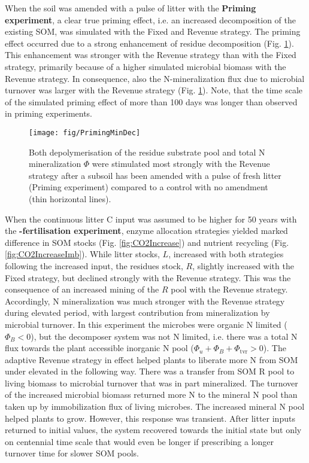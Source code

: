 When the soil was amended with a pulse of litter with the \textbf{Priming
experiment}, a clear true priming effect, i.e. an increased decomposition of the
existing SOM, was simulated with the Fixed and Revenue strategy.
The priming effect occurred due to a strong enhancement of residue decomposition
(Fig. \ref{fig:PrimingMinDec}). This
enhancement was stronger with the Revenue strategy than with the Fixed strategy,
primarily because of a higher simulated microbial biomass with the Revenue
strategy. In consequence, also the N-mineralization flux due to microbial
turnover was larger with the Revenue strategy (Fig. \ref{fig:PrimingMinDec}).
Note, that the time scale of the simulated priming effect of more than 100 days
was longer than observed in priming experiments.

\begin{figure}[t] \vspace*{2mm}
\begin{center}
\texttt{[image: fig/PrimingMinDec]}
\end{center}
\caption{
Both depolymerisation of the residue substrate pool and total N
mineralization $\Phi$ were stimulated most strongly with the Revenue strategy
after a subsoil has been amended with a pulse of fresh litter (Priming experiment)
compared to a control with no amendment (thin horizontal lines).
\label{fig:PrimingMinDec}}
\end{figure}

When the continuous litter C input was assumed to be higher for 50 years with
the \textbf{-fertilisation experiment}, enzyme allocation strategies
yielded marked difference in SOM stocks (Fig. \ref{fig:CO2Increase}) and
nutrient recycling (Fig. \ref{fig:CO2IncreaseImb}).
While litter stocks, $L$, increased with both strategies following the increased
input, the residues stock, $R$, slightly increased with the Fixed strategy, but
declined strongly with the Revenue strategy. This was the consequence of an
increased mining of the $R$ pool with the Revenue strategy. Accordingly, N
mineralization was much stronger with the Revenue strategy during elevated
 period, with largest contribution from mineralization by microbial
turnover. In this experiment the microbes were organic N limited ($\Phi_B < 0$),
but the decomposer system was not N limited, i.e. there was a total N flux
towards the plant accessible inorganic N pool ($\Phi_u + \Phi_B +
\Phi_{\operatorname{tvr}} > 0$). The adaptive Revenue strategy in effect helped
plants to liberate more N from SOM under elevated  in the following
way. There was a transfer from SOM R pool to living biomass to microbial
turnover that was in part mineralized. The turnover of the increased microbial
biomass returned more N to the mineral N pool than taken up by immobilization
flux of living microbes. The increased mineral N pool helped plants to grow.
However, this response was transient. After litter inputs returned to initial
values, the system recovered towards the initial state but only on centennial
time scale that would even be longer if prescribing a longer turnover time for
slower SOM pools.

